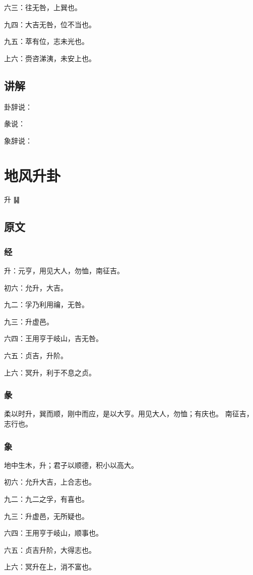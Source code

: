 \documentclass[12pt,oneside]{book}
\begin{document}
六三：往无咎，上巽也。

九四：大吉无咎，位不当也。

九五：萃有位，志未光也。

上六：赍咨涕洟，未安上也。

\section{讲解}
卦辞说：

彖说：

象辞说：

\chapter{地风升卦}
升 {\Large ䷭}

\section{原文}

\subsection{经}
升：元亨，用见大人，勿恤，南征吉。

初六：允升，大吉。

九二：孚乃利用禴，无咎。

九三：升虚邑。

六四：王用亨于岐山，吉无咎。

六五：贞吉，升阶。

上六：冥升，利于不息之贞。


\subsection{彖}
柔以时升，巽而顺，刚中而应，是以大亨。用见大人，勿恤；有庆也。 南征吉，志行也。

\subsection{象}
地中生木，升；君子以顺德，积小以高大。

初六：允升大吉，上合志也。

九二：九二之孚，有喜也。

九三：升虚邑，无所疑也。

六四：王用亨于岐山，顺事也。

六五：贞吉升阶，大得志也。

上六：冥升在上，消不富也。
\end{document}
